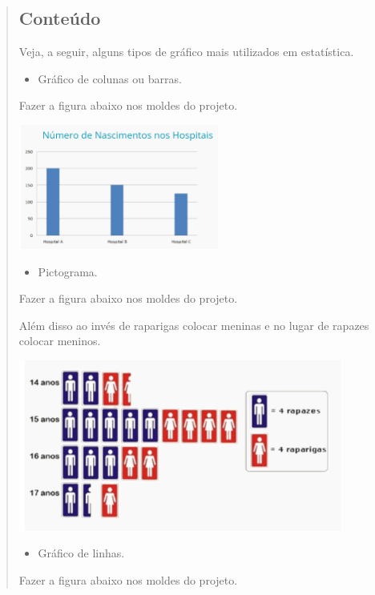 \begin{enumerate}
\begin{escolha}
\begin{enumerate}
\begin{itemize}
\begin{itemize}
\begin{escolha}
\begin{quote}
\begin{escolha}
{\subsection{Conteúdo}\label{conteuxfado-7}

Veja, a seguir, alguns tipos de gráfico mais utilizados em estatística.

\begin{itemize}
\item
  Gráfico de colunas ou barras.
\end{itemize}

Fazer a figura abaixo nos moldes do projeto.

\includegraphics[width=2.58333in,height=1.61458in]{media/image91.png}

\begin{itemize}
\item
  Pictograma.
\end{itemize}

Fazer a figura abaixo nos moldes do projeto.

Além disso ao invés de raparigas colocar meninas e no lugar de rapazes
colocar meninos.

\includegraphics[width=4.18370in,height=2.21686in]{media/image92.png}

\begin{itemize}
\item
  Gráfico de linhas.
\end{itemize}

Fazer a figura abaixo nos moldes do projeto.

}
\end{escolha}
\end{quote}
\end{escolha}
\end{itemize}
\end{itemize}
\end{enumerate}
\end{escolha}
\end{enumerate}
